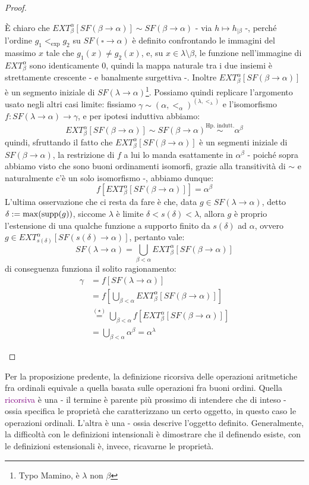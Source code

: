 \begin{proof}
\begin{itemize}
		È chiaro che $EXT_\beta^\alpha[SF(\beta \to \alpha)] \sim SF(\beta \to \alpha)$ - via $h \mapsto h_{|\beta}$ -, perché l'ordine $g_1 <_{\exp} g_2$ su $SF(\square \to \alpha)$ è definito confrontando le immagini del massimo $x$ tale che $g_1(x) \ne g_2(x)$,
		e, su $x \in \lambda\setminus\beta$, le funzione nell'immagine di $EXT_\beta^\alpha$ sono identicamente 0, quindi la mappa naturale tra i due insiemi è strettamente crescente - e banalmente surgettiva -. Inoltre $EXT_\beta^\alpha[SF(\beta \to \alpha)]$
		è un segmento iniziale di $SF(\lambda \to \alpha)$\footnote{Typo Mamino, è $\lambda$ non $\beta$}. Possiamo quindi replicare l'argomento usato negli altri casi limite: fissiamo $\gamma \sim (\alpha,<_\alpha)^{(\lambda,<_\lambda)}$ e l'isomorfismo $f : SF(\lambda \to \alpha) \to \gamma$, e per ipotesi induttiva abbiamo:
		\[ EXT_{\beta}^{\alpha}[SF(\beta \to \alpha)] \sim SF(\beta \to \alpha) \overset{\text{Hp. indutt.}}{\sim} \alpha^\beta
			\]
		quindi, sfruttando il fatto che $EXT_{\beta}^{\alpha}[SF(\beta \to \alpha)]$ è un segmenti iniziale di $SF(\beta \to \alpha)$, la restrizione di $f$ a lui lo manda esattamente in $\alpha^\beta$ - poiché sopra abbiamo visto che sono buoni ordinamenti isomorfi, grazie alla transitività di $\sim$ e naturalmente
		c'è un solo isomorfismo -, abbiamo dunque:
		\[ f[EXT_{\beta}^{\alpha}[SF(\beta \to \alpha)]] = \alpha^\beta
			\]
		L'ultima osservazione che ci resta da fare è che, data $g \in SF(\lambda \to \alpha)$, detto $\delta:=\max(\operatorname{supp}(g))$, siccome $\lambda$ è limite $\delta < s(\delta) < \lambda$, allora $g$ è proprio l'estensione di una qualche funzione a supporto finito da $s(\delta)$ ad $\alpha$, ovvero $g \in EXT_{s(\delta)}^{\alpha}[SF(s(\delta) \to \alpha)]$,
		pertanto vale:
		\[ SF(\lambda \to \alpha) = \bigcup_{\beta < \alpha} EXT_{\beta}^{\alpha}[SF(\beta \to \alpha)]
			\]
		di conseguenza funziona il solito ragionamento:
		\[ \begin{split}
			\gamma &= f[SF(\lambda \to \alpha)] \\
				   &= f\left[\bigcup_{\beta < \alpha} EXT_\beta^\alpha[SF(\beta \to \alpha)]\right] \\
				   &\overset{(\star)}{=}\bigcup_{\beta<\alpha} f[EXT_\beta^\alpha[SF(\beta \to \alpha)]] \\
				   &= \bigcup_{\beta < \alpha} \alpha^\beta = \alpha^\lambda
		\end{split}
			\]
	\end{itemize}
\end{proof}

Per la proposizione predente, la definizione ricorsiva delle operazioni aritmetiche fra ordinali equivale a quella basata sulle operazioni fra buoni ordini. Quella \textcolor{purple}{ricorsiva} è una  - il termine 
è parente più prossimo di intendere che di inteso - ossia specifica le proprietà che caratterizzano un certo oggetto, in questo caso le operazioni ordinali. L'altra è una  -
ossia descrive l'oggetto definito. Generalmente, la difficoltà con le definizioni intensionali è dimostrare che il definendo esiste, con le definizioni estensionali è, invece, ricavarne le proprietà.